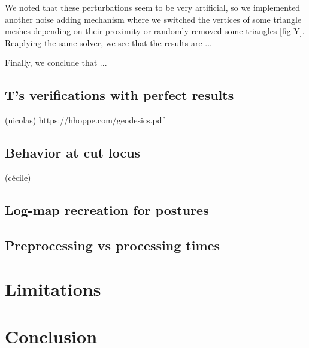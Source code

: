 \documentclass[sigconf]{acmart}
\begin{document}
We noted that these perturbations seem to be very artificial, so we implemented another noise adding mechanism where we switched the vertices of some triangle meshes depending on their proximity or randomly removed some triangles [fig Y]. Reaplying the same solver, we see that the results are ...

Finally, we conclude that ...

\subsection{T's verifications with perfect results}
(nicolas)
https://hhoppe.com/geodesics.pdf

\subsection{Behavior at cut locus}
(cécile)
\subsection{Log-map recreation for postures}

\subsection{Preprocessing vs processing times}

\section{Limitations}
\section{Conclusion}
\end{document}
